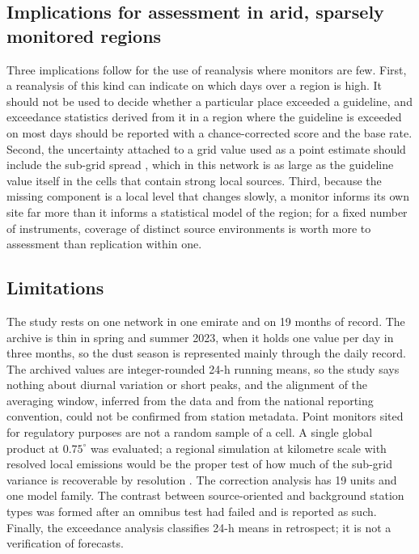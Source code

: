 \subsection{Implications for assessment in arid, sparsely monitored regions}

Three implications follow for the use of reanalysis \pmten{} where monitors are few. First, a
reanalysis of this kind can indicate on which days \pmten{} over a region is high. It should not
be used to decide whether a particular place exceeded a guideline, and exceedance statistics
derived from it in a region where the guideline is exceeded on most days should be reported with
a chance-corrected score and the base rate. Second, the uncertainty attached to a grid value
used as a point estimate should include the sub-grid spread \citep{denby2011}, which in this network is as large
as the guideline value itself in the cells that contain strong local sources. Third, because the
missing component is a local level that changes slowly, a monitor informs its own site far more
than it informs a statistical model of the region; for a fixed number of instruments, coverage
of distinct source environments is worth more to assessment than replication within one.

\subsection{Limitations}
\label{sec:limits}

The study rests on one network in one emirate and on 19 months of record. The archive is thin in
spring and summer 2023, when it holds one value per day in three months, so the dust season is
represented mainly through the daily record. The archived values are integer-rounded 24-h running
means, so the study says nothing about diurnal variation or short peaks, and the alignment of the
averaging window, inferred from the data and from the national reporting convention, could not be
confirmed from station metadata. Point monitors sited for regulatory purposes are not a random
sample of a cell. A single global product at $0.75^{\circ}$ was evaluated; a regional simulation at
kilometre scale with resolved local emissions would be the proper test of how much of the
sub-grid variance is recoverable by resolution \citep{ukhov2020}. The correction analysis has 19
units and one model family. The contrast between source-oriented and background station types was
formed after an omnibus test had failed and is reported as such. Finally, the exceedance analysis
classifies 24-h means in retrospect; it is not a verification of forecasts.

